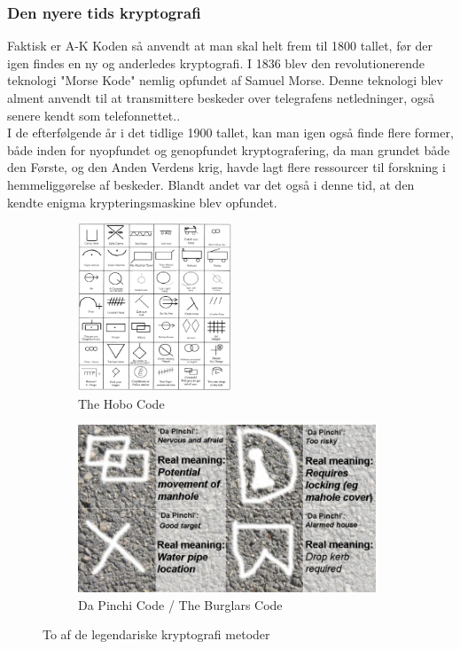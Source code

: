 \subsubsection{Den nyere tids kryptografi}
Faktisk er A-K Koden så anvendt at man skal helt frem til 1800 tallet, før der igen findes en ny og anderledes kryptografi. I 1836 blev den revolutionerende teknologi "Morse Kode" nemlig opfundet af Samuel Morse. Denne teknologi blev alment anvendt til at transmittere beskeder over telegrafens netledninger, også senere kendt som telefonnettet.\cite{Telegraphing}.\\
I de efterfølgende år i det tidlige 1900 tallet, kan man igen også finde flere former, både inden for nyopfundet og genopfundet kryptografering, da man grundet både den Første, og den Anden Verdens krig, havde lagt flere ressourcer til forskning i hemmeliggørelse af beskeder. Blandt andet var det også i denne tid, at den kendte enigma krypteringsmaskine blev opfundet.\cite{PastCryptography}
\begin{figure}[H]
    \begin{subfigure}{0.5\textwidth}
    \includegraphics[width=0.9\linewidth, height=5cm]{Projectdoc/Problemanalyse/Illustrationer/hobo-glyphs-code.jpg} 
    \caption{The Hobo Code}
    \label{fig:hobocode}
    \end{subfigure}
    \begin{subfigure}{0.5\textwidth}
    \includegraphics[width=0.9\linewidth, height=5cm]{Projectdoc/Problemanalyse/Illustrationer/BurglarsCode.jpg}
    \caption{Da Pinchi Code / The Burglars Code}
    \label{fig:burglarscode}
    \end{subfigure}
    \caption{To af de legendariske kryptografi metoder}
    \label{fig:legendscode}
\end{figure}

